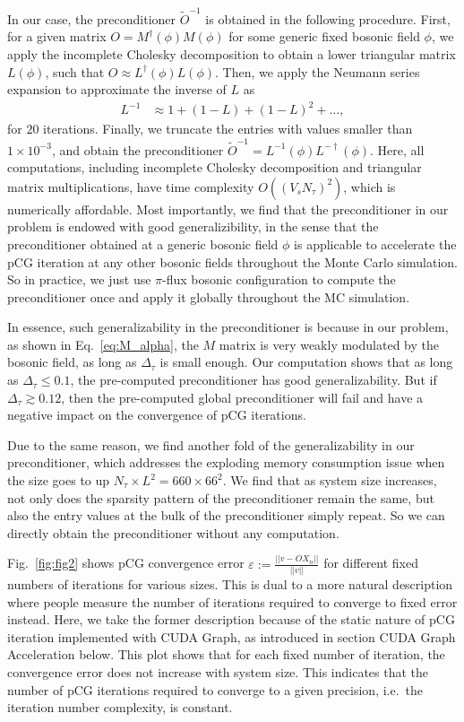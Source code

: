 \documentclass[aps,prl,twocolumn,superscriptaddress,showpacs,longbibliography]{revtex4-2}
\begin{document}
In our case, the preconditioner $\tilde{O}^{-1}$ is obtained in the following procedure. First, for a given matrix $O = M^{\dagger}(\phi)M(\phi)$ for some generic fixed bosonic field $\phi$, we apply the incomplete Cholesky decomposition to obtain a lower triangular matrix $L(\phi)$, such that $O \approx L^\dagger(\phi)L(\phi)$. Then, we apply the Neumann series expansion to approximate the inverse of $L$ as 
\begin{align}
    L^{-1} &\approx 1+(1-L)+(1-L)^2+\ldots ,
\end{align} for $20$ iterations. Finally, we truncate the entries with values smaller than $1\times 10^{-3}$, and obtain the preconditioner $\tilde{O}^{-1} = L^{-1}(\phi)L^{-\dagger}(\phi)$. Here, all computations, including incomplete Cholesky decomposition and triangular matrix multiplications, have time complexity $O((V_sN_\tau)^2)$, which is numerically affordable. Most importantly, we find that the preconditioner in our problem is endowed with good generalizibility,
in the sense that the preconditioner obtained at a generic bosonic field $\phi$ is applicable to accelerate the pCG iteration at any other bosonic fields throughout the Monte Carlo simulation. So in practice, we just use $\pi$-flux bosonic configuration to compute the preconditioner once and apply it globally throughout the MC simulation.

In essence, such generalizability in the preconditioner is because in our problem, as shown in Eq.~\eqref{eq:M_alpha}, the $M$ matrix is very weakly modulated by the bosonic field, as long as $\Delta_\tau$ is small enough. Our computation shows that as long as $\Delta_\tau \leq 0.1$, the pre-computed preconditioner has good generalizability. But if $\Delta_\tau \gtrsim 0.12$, then the pre-computed global preconditioner will fail and have a negative impact on the convergence of pCG iterations.

Due to the same reason, we find another fold of the generalizability in our preconditioner, which addresses the exploding memory consumption issue when the size goes to up $N_\tau \times L^2 = 660\times 66^2$. We find that as system size increases, not only does the sparsity pattern of the preconditioner remain the same, but also the entry values at the bulk of the preconditioner simply repeat. So we can directly obtain the preconditioner without any computation. 

Fig.~\ref{fig:fig2} shows pCG convergence error $\varepsilon := \frac{||v - OX_n||}{||v||}$ for different fixed numbers of iterations for various sizes. This is dual to a more natural description where people measure the number of iterations required to converge to fixed error instead. Here, we take the former description because of the static nature of pCG iteration implemented with CUDA Graph, as introduced in section CUDA Graph Acceleration below. This plot shows that for each fixed number of iteration, the convergence error does not increase with system size. This indicates that the number of pCG iterations required to converge to a given precision, i.e.~the iteration number complexity, is constant.\\
\end{document}
